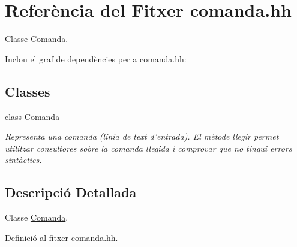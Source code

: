 \hypertarget{comanda_8hh}{\section{Referència del Fitxer comanda.\-hh}
\label{comanda_8hh}
}


Classe \hyperlink{class_comanda}{Comanda}.  


Inclou el graf de dependències per a comanda.\-hh\-:
\subsection*{Classes}
\begin{DoxyCompactItemize}
\item 
class \hyperlink{class_comanda}{Comanda}
\begin{DoxyCompactList}\small\item\em Representa una comanda (línia de text d'entrada). El mètode llegir permet utilitzar consultores sobre la comanda llegida i comprovar que no tingui errors sintàctics. \end{DoxyCompactList}\end{DoxyCompactItemize}


\subsection{Descripció Detallada}
Classe \hyperlink{class_comanda}{Comanda}. 

Definició al fitxer \hyperlink{comanda_8hh_source}{comanda.\-hh}.

